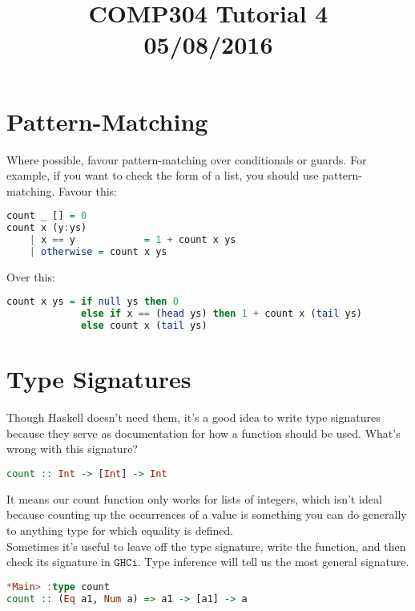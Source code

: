 \documentclass[a4paper,12pt]{article}
\newcommand{\kwa}[1]{\mathtt{#1}}
\begin{document}
\title{COMP304 Tutorial 4 \\ 05/08/2016}
\date{}
\maketitle

\section{Pattern-Matching}

\noindent
Where possible, favour pattern-matching over conditionals or guards. For example, if you want to check the form of a list, you should use pattern-matching. Favour this:

\begin{lstlisting}[language=Haskell]
count _ [] = 0
count x (y:ys)
	| x == y			= 1 + count x ys
	| otherwise	= count x ys
\end{lstlisting}

\noindent
Over this:

\begin{lstlisting}[language=Haskell]
count x ys = if null ys then 0
             else if x == (head ys) then 1 + count x (tail ys)
             else count x (tail ys)
\end{lstlisting}

\section{Type Signatures}

\noindent
Though Haskell doesn't need them, it's a good idea to write type signatures because they serve as documentation for how a function should be used. What's wrong with this signature?

\begin{lstlisting}[language=Haskell]
count :: Int -> [Int] -> Int
\end{lstlisting}

\noindent
It means our count function only works for lists of integers, which isn't ideal because counting up the occurrences of a value is something you can do generally to anything type for which equality is defined. \\

\noindent
Sometimes it's useful to leave off the type signature, write the function, and then check its signature in $\kwa{GHCi}$. Type inference will tell us the most general signature.

\begin{lstlisting}[language=Haskell]
*Main> :type count
count :: (Eq a1, Num a) => a1 -> [a1] -> a
\end{lstlisting}
\end{document}
